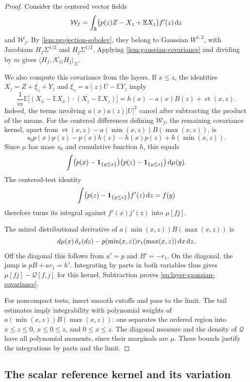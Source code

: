 \begin{proof}
Consider the centered vector fields
\[
 \mathcal{W}_f
    =\int_{\mathbb{R}}
       \bigl(p(z)Z-X_z+\mathbb{E} X_z\bigr)f'(z)\,\mathrm{d} z
\]
and $\mathcal{W}_j$. By \cref{lem:projection-sobolev}, they belong to Gaussian $W^{1,2}$, with Jacobians $H_f\Sigma^{1/2}$ and $H_j\Sigma^{1/2}$. Applying \cref{lem:gaussian-covariance} and dividing by $m$ gives $\langle H_f,\mathcal{K}_GH_j\rangle_\Sigma$.

We also compute this covariance from the layers. If $x\leq z$, the identities $X_z=Z+\xi_z+Y_z$ and $\xi_z=a(z)U-\mathbb{E} Y_z$ imply
\[
 \frac1m\mathbb{E}
   \bigl[(X_x-\mathbb{E} X_x)\cdot(X_z-\mathbb{E} X_z)\bigr]
   =h(x)-a(x)B(z)+\operatorname{ct}(x,z).
\]
Indeed, the terms involving $a(x)a(z)|U|^2$ cancel after subtracting the product of the means. For the centered differences defining $\mathcal{W}_f$, the remaining covariance kernel, apart from $\operatorname{ct}(x,z)-a(\min(x,z))B(\max(x,z))$, is
\[
 s_0p(x)p(z)-p(x)h(z)-h(x)p(z)+h(\min(x,z)).
\]
Since $\mu$ has mass $s_0$ and cumulative function $h$, this equals
\[
 \int
  \bigl(p(x)-\mathbf1_{\{y\leq x\}}\bigr)
  \bigl(p(z)-\mathbf1_{\{y\leq z\}}\bigr)\,\mathrm{d} \mu(y).
\]
The centered-test identity
\[
 \int\bigl(p(z)-\mathbf1_{\{y\leq z\}}\bigr)f'(z)\,\mathrm{d} z=f(y)
\]
therefore turns its integral against $f'(x)j'(z)$ into $\mu[fj]$.

The mixed distributional derivative of $a(\min(x,z))B(\max(x,z))$ is
\[
 d\mu(x)\,\delta_x(dz)
  -p(\min(x,z))r_1(\max(x,z))\,\mathrm{d} x\,\mathrm{d} z.
\]
Off the diagonal this follows from $a'=p$ and $B'=-r_1$. On the diagonal, the jump is $pB+a r_1=h'$. Integrating by parts in both variables thus gives $\mu[fj]-\mathcal{Q}[f,j]$ for this kernel. Subtraction proves \eqref{eq:layer-gaussian-covariance}.

For noncompact tests, insert smooth cutoffs and pass to the limit. The tail estimates imply integrability with polynomial weights of $a(\min(x,z))B(\max(x,z))$: one separates the ordered region into $x\leq z\leq0$, $x\leq0\leq z$, and $0\leq x\leq z$. The diagonal measure and the density of $\mathcal{Q}$ have all polynomial moments, since their marginals are $\mu$. These bounds justify the integrations by parts and the limit.
\end{proof}

\subsection{The scalar reference kernel and its variation}


